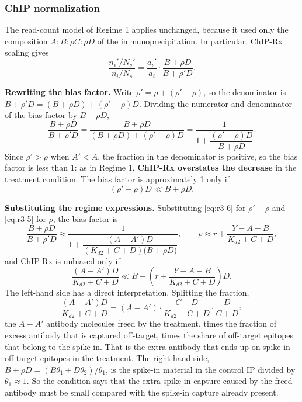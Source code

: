 \subsubsection{ChIP normalization}

The read-count model of Regime 1 applies unchanged, because it used only
the composition $A:B:\rho C:\rho D$ of the immunoprecipitation. In
particular, ChIP-Rx scaling gives
$$
\frac{n_i'/N_s'}{n_i/N_s}
=\frac{a_i'}{a_i}\cdot\frac{B+\rho D}{B+\rho' D}.
$$

\textbf{Rewriting the bias factor.} Write $\rho'=\rho+(\rho'-\rho)$, so
the denominator is
$B+\rho'D=(B+\rho D)+(\rho'-\rho)D$. Dividing the numerator and
denominator of the bias factor by $B+\rho D$,
$$
\frac{B+\rho D}{B+\rho'D}
=\frac{B+\rho D}{(B+\rho D)+(\rho'-\rho)D}
=\frac{1}{1+\dfrac{(\rho'-\rho)D}{B+\rho D}}.
$$
Since $\rho'>\rho$ when $A'<A$, the fraction in the denominator is
positive, so the bias factor is less than 1: as in Regime 1,
\textbf{ChIP-Rx overstates the decrease} in the treatment condition. The
bias factor is approximately 1 only if
$$
(\rho'-\rho)D\ll B+\rho D.
$$

\textbf{Substituting the regime expressions.} Substituting
\eqref{eq:r3-6} for $\rho'-\rho$ and \eqref{eq:r3-5} for $\rho$, the
bias factor is
$$
\frac{B+\rho D}{B+\rho'D}
\approx\frac{1}{1+\dfrac{(A-A')D}{(K_{d2}+C+D)\bigl(B+\rho D\bigr)}},
\qquad
\rho\approx r+\frac{Y-A-B}{K_{d2}+C+D},
$$
and ChIP-Rx is unbiased only if
$$
\frac{(A-A')D}{K_{d2}+C+D}\ll B+\left(r+\frac{Y-A-B}{K_{d2}+C+D}\right)D.
$$
The left-hand side has a direct interpretation. Splitting the fraction,
$$
\frac{(A-A')D}{K_{d2}+C+D}
=(A-A')\cdot\frac{C+D}{K_{d2}+C+D}\cdot\frac{D}{C+D}:
$$
the $A-A'$ antibody molecules freed by the treatment, times the fraction
of excess antibody that is captured off-target, times the share of
off-target epitopes that belong to the spike-in. That is the extra
antibody that ends up on spike-in off-target epitopes in the treatment.
The right-hand side, $B+\rho D=(B\theta_1+D\theta_2)/\theta_1$, is the
spike-in material in the control IP divided by $\theta_1\approx1$. So the
condition says that the extra spike-in capture caused by the freed
antibody must be small compared with the spike-in capture already
present.

